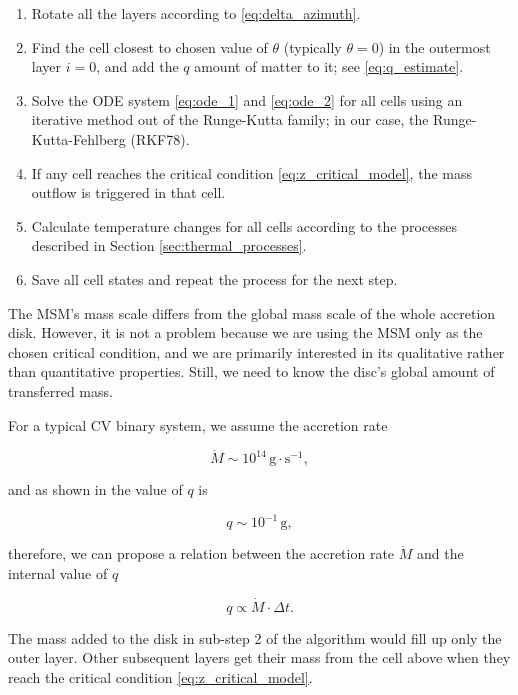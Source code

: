 \begin{enumerate}
	\item Rotate all the layers according to \eqref{eq:delta_azimuth}.
	\item Find the cell closest to chosen value of $\theta$ (typically $\theta = 0$) in the outermost layer $i = 0$, and add the $q$ amount of matter to it; see \eqref{eq:q_estimate}.
	\item Solve the ODE system \eqref{eq:ode_1} and \eqref{eq:ode_2} for all cells using an iterative method out of the Runge-Kutta family; in our case, the Runge-Kutta-Fehlberg (RKF78).
	\item If any cell reaches the critical condition \eqref{eq:z_critical_model}, the mass outflow is triggered in that cell.
    \item Calculate temperature changes for all cells according to the processes described in Section \ref{sec:thermal_processes}.
	\item Save all cell states and repeat the process for the next step.
\end{enumerate}

The MSM's mass scale differs from the global mass scale of the whole accretion disk. However, it is not a problem because we are using the MSM only as the chosen critical condition, and we are primarily interested in its qualitative rather than quantitative properties. Still, we need to know the disc's global amount of transferred mass.

For a typical CV binary system, we assume the accretion rate \cite{ae_shortrev2015}

\begin{equation}
	\dot{M} \sim 10^{14}\, \mathrm{g \cdot s^{-1}},
\end{equation}

and as shown in \cite{msmm1999} the value of $q$ is

\begin{equation}
	\label{eq:q_estimate}
	q \sim 10^{-1}\, \mathrm{g},
\end{equation} 

therefore, we can propose a relation between the accretion rate $\dot{M}$ and the internal value of $q$

\begin{equation}
	q \propto \dot{M} \cdot \Delta t.
\end{equation}

The mass added to the disk in sub-step 2 of the algorithm would fill up only the outer layer. Other subsequent layers get their mass from the cell above when they reach the critical condition \eqref{eq:z_critical_model}.

